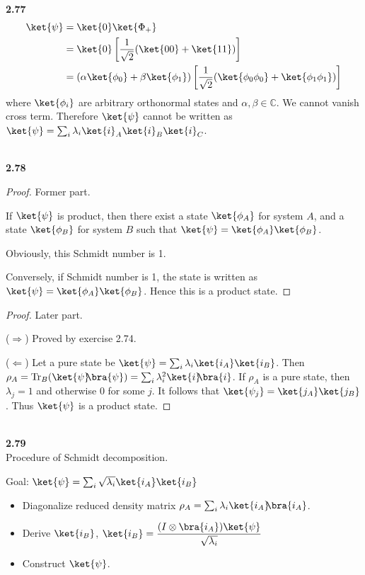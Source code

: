 \documentclass[10pt]{book}
\DeclareMathOperator{\Tr}{Tr}
\newcommand{\kb}[1]{\ket{#1}\hspace{-1mm} \bra{#1}} %
\newcommand{\Textbf}[1]{\hspace{3mm}\\ \textbf{#1}\\}
\begin{document}
	\Textbf{2.77}
	\begin{equation}
\begin{aligned}
		\ket{\psi}  &=  \ket{0}  \ket{\Phi_+}\\
		&= \ket{0} \left[\frac{1}{\sqrt{2}}(\ket{00} + \ket{11})\right]\\
		&= (\alpha \ket{\phi_0} + \beta \ket{\phi_1})  \left[\frac{1}{\sqrt{2}}(\ket{\phi_0 \phi_0} + \ket{\phi_1 \phi_1})\right]\\
	\end{aligned}
\end{equation}
	where $\ket{\phi_i}$ are arbitrary orthonormal states and $\alpha, \beta \in \mathds{C}$.
	We cannot vanish cross term. Therefore $\ket{\psi}$ cannot be written as $\ket{\psi} = \sum_i \lambda_i \ket{i}_A \ket{i}_B \ket{i}_C$.
	
	
	\Textbf{2.78}
	\begin{proof}
		Former part.
		
		If $\ket{\psi}$ is product, then there exist a state $\ket{\phi_A}$ for system $A$, and a state $\ket{\phi_B}$ for system $B$ such that
		$\ket{\psi} = \ket{\phi_A} \ket{\phi_B}$.
		
		Obviously, this Schmidt number is  1.
		
		Conversely, if Schmidt number is 1, the state is written as $\ket{\psi} = \ket{\phi_A} \ket{\phi_B}$.
		Hence this is a product state.
	\end{proof}
	
	
	\begin{proof}
		Later part.
		
		($\Rightarrow$) Proved by exercise 2.74.
		
		($\Leftarrow$) Let a pure state be  $\ket{\psi} = \sum_i \lambda_i \ket{i_A} \ket{i_B}$. Then $\rho_A = \Tr_B (\kb{\psi}) = \sum_i \lambda_i^2 \kb{i}$.
		If $\rho_A$ is a pure state, then $\lambda_j = 1$ and otherwise 0 for some $j$.
		It follows that  $\ket{\psi_j} = \ket{j_A} \ket{j_B}$. Thus $\ket{\psi}$ is a product state.
	\end{proof}
	
	
	\Textbf{2.79}
	
		Procedure of Schmidt decomposition.
		
		Goal: $\ket{\psi} = \sum_{i} \sqrt{\lambda_i} \ket{i_A} \ket{i_B}$
		
		\begin{itemize}
			\item Diagonalize reduced density matrix $\rho_A = \sum_i \lambda_i \kb{i_A}$.
			\item Derive $\ket{i_B}$, $\displaystyle  \ket{i_B} = \frac{(I \otimes \bra{i_A}) \ket{\psi}}{\sqrt{\lambda_i}}$
			\item Construct $\ket{\psi}$.
		\end{itemize}
		
\end{document}
